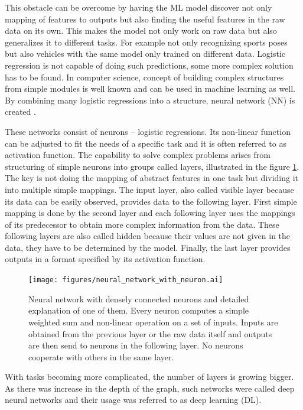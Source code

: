 This obstacle can be overcome by having the ML model discover not only mapping of features to outputs but also finding the useful features in the raw data on its own. This makes the model not only work on raw data but also generalizes it to different tasks. For example not only recognizing sports poses but also vehicles with the same model only trained on different data. Logistic regression is not capable of doing such predictions, some more complex solution has to be found. In computer science, concept of building complex structures from simple modules is well known and can be used in machine learning as well. By combining many logistic regressions into a structure, neural network (NN) is created \cite{Goodfellow-et-al-2016}.

These networks consist of neurons -- logistic regressions. Its non-linear function can be adjusted to fit the needs of a specific task and it is often referred to as activation function. The capability to solve complex problems arises from structuring of simple neurons into groups called layers, illustrated in the figure \ref{fig:network-with-neuron}. The key is not doing the mapping of abstract features in one task but dividing it into multiple simple mappings. The input layer, also called visible layer because its data can be easily observed, provides data to the following layer. First simple mapping is done by the second layer and each following layer uses the mappings of its predecessor to obtain more complex information from the data. These following layers are also called hidden because their values are not given in the data, they have to be determined by the model. Finally, the last layer provides outputs in a format specified by its activation function.

\begin{figure}[ht]\centering
    \centering
    \texttt{[image: figures/neural\_network\_with\_neuron.ai]}
    \caption{Neural network with densely connected neurons and detailed explanation of one of them. Every neuron computes a simple weighted sum and non-linear operation on a set of inputs. Inputs are obtained from the previous layer or the raw data itself and outputs are then send to neurons in the following layer. No neurons cooperate with others in the same layer.}
    \label{fig:network-with-neuron}
\end{figure}

With tasks becoming more complicated, the number of layers is growing bigger. As there was increase in the depth of the graph, such networks were called deep neural networks and their usage was referred to as deep learning (DL).

